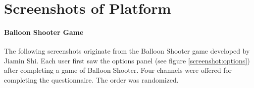   
  \label{appendix:interview-passerby}

  
  \label{appendix:semi-structured-interview}





\cleardoublepage
\section{Screenshots of Platform}



\paragraph{Balloon Shooter Game}


\label{appendix:screenshots-balloon-shooter}

The following screenshots originate from the Balloon Shooter game developed by Jiamin Shi.
Each user first saw the options panel (see figure \ref{screenshot:options}) after completing a game of Balloon Shooter. Four channels were offered for completing the questionnaire. The order was randomized. \\




